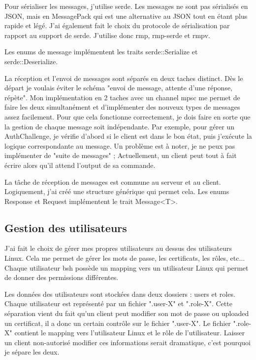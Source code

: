 \documentclass[french]{article}
\begin{document}
\medspace

Pour sérialiser les messages, j'utilise serde. Les messages ne sont pas sérialisés en JSON, mais en MessagePack qui est une alternative au JSON tout en étant plus rapide et légé. J'ai également fait le choix du protocole de sérialisation par rapport au support de serde.
J'utilise donc rmp, rmp-serde et rmpv.

Les enums de message implémentent les traits serde::Serialize et serde::Deserialize.

La réception et l'envoi de messages sont séparés en deux taches distinct. Dès le départ je voulais éviter le schéma "envoi de message, attente d'une réponse, répète". Mon implémentation en 2 taches avec un channel mpsc me permet de faire les deux simultanément et d'implémenter des nouveux types de messages assez facilement. Pour que cela fonctionne correctement, je dois faire en sorte que la gestion de chaque message soit indépendante. Par exemple, pour gérer un AuthChallenge, je vérifie d'abord si le client est dans le bon état, puis j'exécute la logique correspondante au message.
Un problème est à noter, je ne peux pas implémenter de "suite de messages" ; Actuellement, un client peut tout à fait écrire alors qu'il attend l'output de sa commande.

La tâche de réception de messages est commune au serveur et au client. Logiquement, j'ai créé une structure générique qui permet cela. Les enums Response et Request implémentent le trait Message<T>.

\subsection{Gestion des utilisateurs}

J'ai fait le choix de gérer mes propres utilisateurs au dessus des utilisateurs Linux. Cela me permet de gérer les mots de passe, les certificats, les rôles, etc... Chaque utilisateur bsh possède un mapping vers un utilisateur Linux qui permet de donner des permissions différentes.

\medspace

Les données des utilisateurs sont stockées dans deux dossiers : users et roles. Chaque utilisateur est représenté par un fichier ".user-X" et ".role-X". Cette séparation vient du fait qu'un client peut modifier son mot de passe ou uploaded un certificat, il a donc un certain contrôle sur le fichier ".user-X". Le fichier ".role-X" contient le mapping vers l'utilisateur Linux et le rôle de l'utilisateur. Laisser un client non-autorisé modifier ces informations serait dramatique, c'est pourquoi je sépare les deux.
\end{document}
